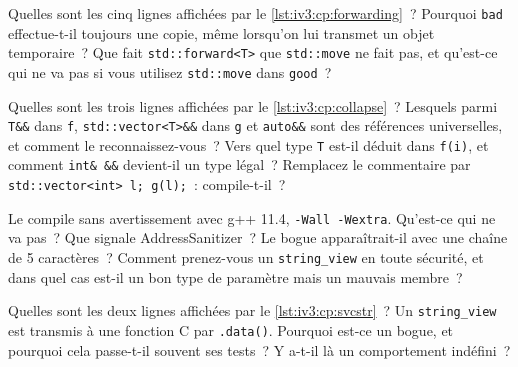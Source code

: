 \begin{question}\label{iq:iv3:cpp:18}
Quelles sont les cinq lignes affichées par le \cref{lst:iv3:cp:forwarding}~? Pourquoi \texttt{bad} effectue-t-il toujours une copie, même lorsqu'on lui transmet un objet temporaire~? Que fait \texttt{std::forward<T>} que \texttt{std::move} ne fait pas, et qu'est-ce qui ne va pas si vous utilisez \texttt{std::move} dans \texttt{good}~?
\label{lst:iv3:cp:forwarding}
\end{question}

\begin{question}\label{iq:iv3:cpp:19}
Quelles sont les trois lignes affichées par le \cref{lst:iv3:cp:collapse}~? Lesquels parmi \texttt{T\&\&} dans \texttt{f}, \texttt{std::vector<T>\&\&} dans \texttt{g} et \texttt{auto\&\&} sont des références universelles, et comment le reconnaissez-vous~? Vers quel type \texttt{T} est-il déduit dans \texttt{f(i)}, et comment \texttt{int\& \&\&} devient-il un type légal~? Remplacez le commentaire par \texttt{std::vector<int> l; g(l);}~: compile-t-il~?
\label{lst:iv3:cp:collapse}
\end{question}

\begin{question}\label{iq:iv3:cpp:20}
Le  compile sans avertissement avec g++ 11.4, \texttt{-Wall -Wextra}. Qu'est-ce qui ne va pas~? Que signale AddressSanitizer~? Le bogue apparaîtrait-il avec une chaîne de 5 caractères~? Comment prenez-vous un \texttt{string\_view} en toute sécurité, et dans quel cas est-il un bon type de paramètre mais un mauvais membre~?
\label{lst:iv3:cp:svtemp}
\end{question}

\begin{question}\label{iq:iv3:cpp:21}
Quelles sont les deux lignes affichées par le \cref{lst:iv3:cp:svcstr}~? Un \texttt{string\_view} est transmis à une fonction C par \texttt{.data()}. Pourquoi est-ce un bogue, et pourquoi cela passe-t-il souvent ses tests~? Y a-t-il là un comportement indéfini~?
\label{lst:iv3:cp:svcstr}
\end{question}

